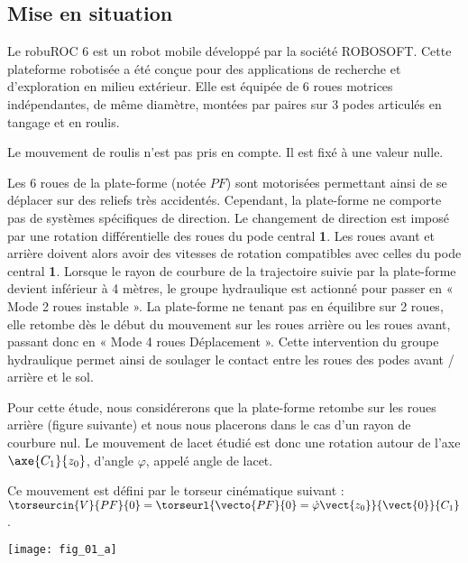 \ifprof
\else
\begin{multicols}{2}
\fi

\section*{Mise en situation}
\ifprof
\else

Le robuROC 6 est un robot mobile développé par la société ROBOSOFT. Cette plateforme
robotisée a été conçue pour des applications de recherche et d’exploration en milieu extérieur. Elle est
équipée de 6 roues motrices indépendantes, de même diamètre, montées par paires sur 3 podes articulés en
tangage et en roulis.

\begin{hypo}
Le mouvement de roulis n’est pas pris en compte. Il est fixé à une valeur nulle.
\end{hypo}

Les 6 roues de la plate-forme (notée $PF$) sont motorisées permettant ainsi de se déplacer sur des reliefs très
accidentés. Cependant, la plate-forme ne comporte pas de systèmes spécifiques de direction. Le changement de
direction est imposé par une rotation différentielle des roues du pode central \textbf{1}. Les roues avant et arrière doivent alors
avoir des vitesses de rotation compatibles avec celles du pode central \textbf{1}. Lorsque le rayon de courbure de la trajectoire
suivie par la plate-forme devient inférieur à 4 mètres, le groupe hydraulique est actionné pour passer en « Mode 2
roues instable ». La plate-forme ne tenant pas en équilibre sur 2 roues, elle retombe dès le début du mouvement sur
les roues arrière ou les roues avant, passant donc en « Mode 4 roues Déplacement ». Cette intervention du groupe
hydraulique permet ainsi de soulager le contact entre les roues des podes avant / arrière et le sol. 

Pour cette étude, nous considérerons que la plate-forme retombe sur les roues arrière (figure suivante) et nous nous placerons dans le cas d’un rayon de courbure nul. Le mouvement de lacet étudié est donc une rotation autour de l’axe $\axe{C_1}{z_0}$, d’angle  $\varphi$, appelé angle de lacet.


Ce mouvement est défini par le torseur cinématique suivant : $\torseurcin{V}{PF}{0}=\torseurl{\vecto{PF}{0}=\dot{\varphi}\vect{z_0}}{\vect{0}}{C_1}$.



\begin{center}
\texttt{[image: fig\_01\_a]}
\end{center}



\end{multicols}

